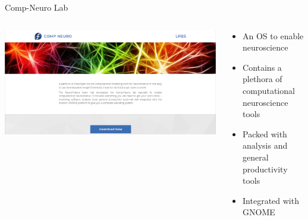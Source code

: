 \begin{frame}[c]{Comp-Neuro Lab}
	\begin{columns}
		\begin{column}{0.4\textwidth}
			\includegraphics[keepaspectratio,width=\textwidth]{images/comp-neuro-lab.png}
		\end{column}
  		\begin{column}{0.6\textwidth}	
			\begin{itemize}
				\item An OS to enable neuroscience
				\item Contains a plethora of computational neuroscience tools
				\item Packed with analysis and general productivity tools
				\item Integrated with GNOME
			\end{itemize}
		\end{column}
	\end{columns}
\end{frame}

